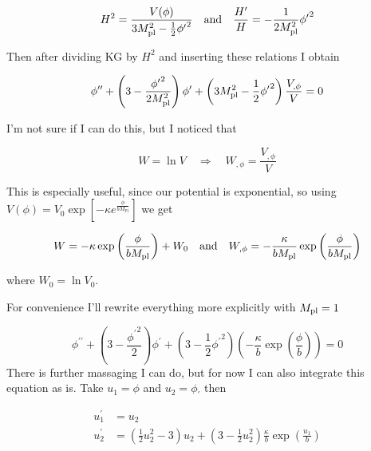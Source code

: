 \begin{equation*}
    H^2 = \frac{V(\phi)}{3 M_{\rm pl}^2 - \frac{1}{2} {\phi^{\prime}}^2} \quad \text{and} \quad \frac{H^{\prime}}{H} = -\frac{1}{2 M_{\rm pl}^2} {\phi^{\prime}}^2
\end{equation*}

Then after dividing KG by $H^2$ and inserting these relations I obtain

\begin{equation*}
    \phi^{\prime \prime} + \left( 3 - \frac{{\phi^{\prime}}^2}{2 M_{\rm pl}^2} \right) \phi^{\prime} + \left( 3 M_{\rm pl}^2 - \frac{1}{2} {\phi^{\prime}}^2 \right) \frac{V_{, \phi}}{V} = 0
\end{equation*}

I'm not sure if I can do this, but I noticed that

\begin{equation*}
    W = \ln V \quad \Rightarrow \quad W_{, \phi} = \frac{V_{, \phi}}{V}
\end{equation*}

This is especially useful, since our potential is exponential, so using $V(\phi) = V_0 \exp \left[ - \kappa e^{\frac{\phi}{b M_{\text{Pl}}}} \right]$ we get

\begin{equation*}
    W = - \kappa \exp \left( \frac{\phi}{b M_{\rm pl}} \right) + W_0 \quad \text{and} \quad W_{, \phi} = -\frac{\kappa}{b M_{\rm pl}} \exp \left( \frac{\phi}{b M_{\rm pl}} \right)
\end{equation*}

where $W_0 = \ln V_0$. 

For convenience I'll rewrite everything more explicitly with $M_{\rm pl} = 1$

\begin{equation*}
    \phi^{\prime \prime} + \left( 3 - \frac{{\phi^{\prime}}^2}{2} \right) \phi^{\prime} + \left( 3 - \frac{1}{2} {\phi^{\prime}}^2 \right) \left( -\frac{\kappa}{b} \exp \left( \frac{\phi}{b} \right) \right) = 0
\end{equation*}
There is further massaging I can do, but for now I can also integrate this equation as is. Take $u_1 = \phi$ and $u_2 = \phi_{\prime}$ then

\begin{align*}
    u_1^{\prime} &= u_2 \\
    u_2^{\prime} &= \left( \frac{1}{2} u_2^2 - 3 \right)u_2 + \left( 3 - \frac{1}{2} u_2^2 \right) \frac{\kappa}{b} \exp \left( \frac{u_1}{b} \right)
\end{align*}

